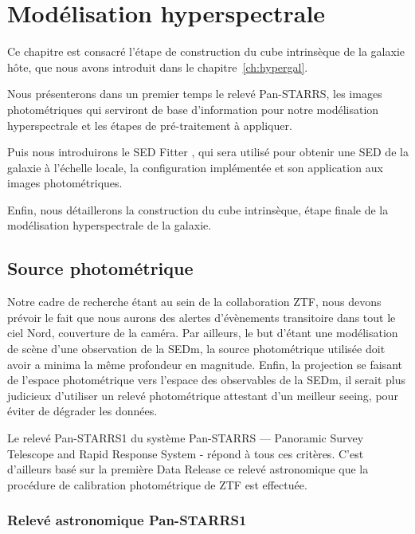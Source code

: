 \documentclass[../main/main.tex]{subfiles}
\begin{document}
\chapter{Modélisation hyperspectrale}\label{ch:modelhyperspec}

\minitoc
\vspace{2cm}
Ce chapitre est consacré l'étape de construction du cube intrinsèque de
la galaxie hôte, que nous avons introduit dans le
chapitre~\ref{ch:hypergal}.

Nous présenterons dans un premier temps le relevé Pan-STARRS, les images photométriques
qui serviront de base d'information pour notre modélisation hyperspectrale et les
étapes de pré-traitement à appliquer.

Puis nous introduirons le SED Fitter , qui sera utilisé pour
obtenir une SED de la galaxie à l'échelle locale, la configuration
implémentée et son application aux images photométriques.

Enfin, nous détaillerons la construction du cube intrinsèque, étape
finale de la modélisation hyperspectrale de la galaxie.
\newpage

\section{Source photométrique}
\label{sec:photosource}

Notre cadre de recherche étant au sein de la collaboration ZTF, nous
devons prévoir le fait que nous aurons des alertes d'évènements
transitoire dans tout le ciel Nord, couverture de la caméra. Par
ailleurs, le but d'\hypergal étant une modélisation de scène d'une
observation de la SEDm, la source photométrique utilisée doit avoir a
minima la même profondeur en magnitude. Enfin, la projection se faisant
de l'espace photométrique vers l'espace des observables de la SEDm, il
serait plus judicieux d'utiliser un relevé photométrique attestant d'un
meilleur seeing, pour éviter de dégrader les données.

Le relevé Pan-STARRS1 du système Pan-STARRS — Panoramic Survey Telescope and Rapid
Response System - \citep{Kaiser2002,Kaiser2010} répond à tous ces critères. C'est d'ailleurs basé sur
la première Data Release ce relevé astronomique que la procédure de calibration photométrique
de ZTF est effectuée.

\subsection{Relevé astronomique Pan-STARRS1}
\label{ssec:ps1}
\end{document}
